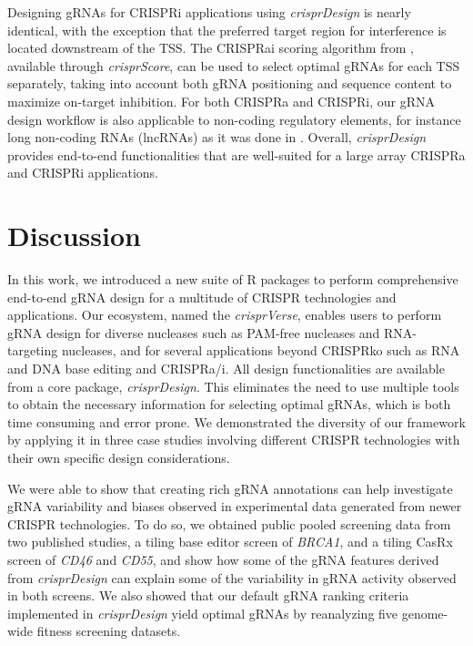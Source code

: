 \documentclass[pdftex,english,10pt]{article}
\begin{document}
Designing gRNAs for CRISPRi applications using \textit{crisprDesign} is nearly identical, with the exception that the preferred target region for interference is located downstream of the TSS. The CRISPRai scoring algorithm from \citet{crispria}, available through \textit{crisprScore}, can be used to select optimal gRNAs for each TSS separately, taking into account both gRNA positioning and sequence content to maximize on-target inhibition. For both CRISPRa and CRISPRi, our gRNA design workflow is also applicable to non-coding regulatory elements, for instance long non-coding RNAs (lncRNAs) as it was done in \citet{liu2017crispri}. Overall, \textit{crisprDesign} provides end-to-end functionalities that are well-suited for a large array CRISPRa and CRISPRi applications.




\section{Discussion}


In this work, we introduced a new suite of R packages to perform comprehensive end-to-end gRNA design for a multitude of CRISPR technologies and applications. Our ecosystem, named the \textit{crisprVerse},  enables users to perform gRNA design for diverse nucleases such as PAM-free nucleases and RNA-targeting nucleases, and for several applications beyond CRISPRko such as RNA and DNA base editing and CRISPRa/i. All design functionalities are available from a core package, \textit{crisprDesign}. This eliminates the need to use multiple tools to obtain the necessary information for selecting optimal gRNAs, which is both time consuming and error prone. We demonstrated the diversity of our framework by applying it in three case studies involving different CRISPR technologies with their own specific design considerations. 

We were able to show that creating rich gRNA annotations can help investigate gRNA variability and biases observed in experimental data generated from newer CRISPR technologies. To do so, we obtained public pooled screening data from two published studies, a tiling base editor screen of \textit{BRCA1}, and a tiling CasRx screen of \textit{CD46} and \textit{CD55}, and show how some of the gRNA features derived from \textit{crisprDesign} can explain some of the variability in gRNA activity observed in both screens. We also showed that our default gRNA ranking criteria implemented in \textit{crisprDesign} yield optimal gRNAs by reanalyzing five genome-wide fitness screening datasets. 
\end{document}

